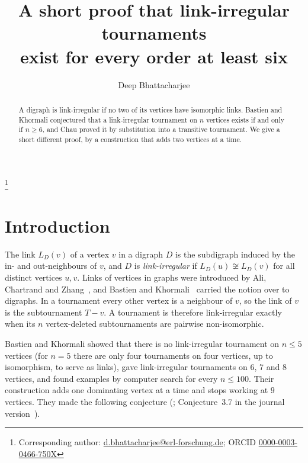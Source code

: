 \documentclass[11pt]{amsart}
\theoremstyle{definition}
\theoremstyle{remark}
\numberwithin{equation}{section}
\begin{document}
\title[Link-irregular tournaments]{A short proof that link-irregular tournaments\\ exist for every order at least six}

\author{Deep Bhattacharjee}
\address{Formerly, Electro-Gravitational Space Propulsion Laboratory (EGSPL),\newline Bhubaneswar, Odisha 751030, India}
\thanks{Corresponding author: \href{mailto:d.bhattacharjee@erl-forschung.de}{d.bhattacharjee@erl-forschung.de}; ORCID \href{https://orcid.org/0000-0003-0466-750X}{\mbox{0000-0003-0466-750X}}}


\begin{abstract}
A digraph is link-irregular if no two of its vertices have isomorphic links. Bastien and Khormali conjectured that a link-irregular tournament on $n$ vertices exists if and only if $n\ge6$, and Chau proved it by substitution into a transitive tournament. We give a short different proof, by a construction that adds two vertices at a time.
\end{abstract}

\maketitle

\section{Introduction}

The link $L_D(v)$ of a vertex $v$ in a digraph $D$ is the subdigraph induced by the in- and out-neighbours of $v$, and $D$ is \emph{link-irregular} if $L_D(u)\not\cong L_D(v)$ for all distinct vertices $u,v$. Links of vertices in graphs were introduced by Ali, Chartrand and Zhang~\cite{ACZ}, and Bastien and Khormali~\cite{BK} carried the notion over to digraphs. In a tournament every other vertex is a neighbour of $v$, so the link of $v$ is the subtournament $T-v$. A tournament is therefore link-irregular exactly when its $n$ vertex-deleted subtournaments are pairwise non-isomorphic.

Bastien and Khormali showed that there is no link-irregular tournament on $n\le5$ vertices (for $n=5$ there are only four tournaments on four vertices, up to isomorphism, to serve as links), gave link-irregular tournaments on $6$, $7$ and $8$ vertices, and found examples by computer search for every $n\le100$. Their construction adds one dominating vertex at a time and stops working at $9$ vertices. They made the following conjecture (\cite[Conjecture~6]{BK}; Conjecture~3.7 in the journal version~\cite{BKj}).
\end{document}
